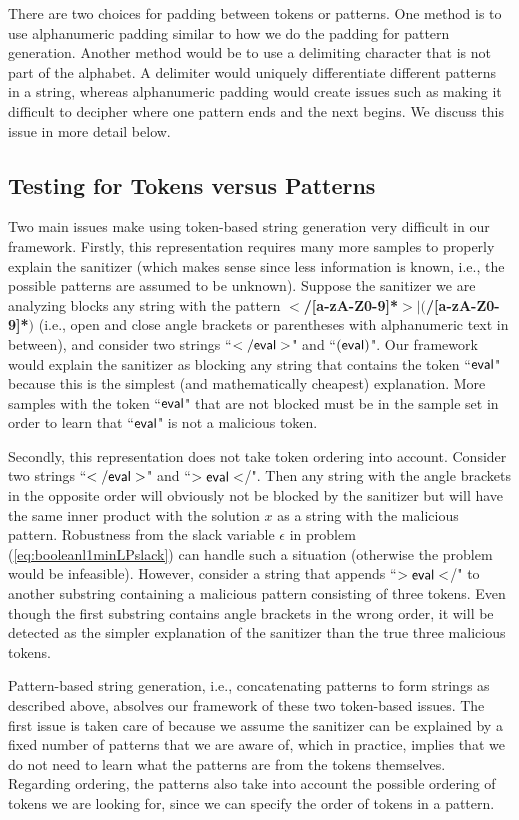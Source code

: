 There are two choices for padding between tokens or patterns. One method is to use alphanumeric padding similar to how we do the padding for pattern generation. Another method would be to use a delimiting character that is not part of the alphabet. A delimiter would uniquely differentiate different patterns in a string, whereas alphanumeric padding would create issues such as making it difficult to decipher where one pattern ends and the next begins. We discuss this issue in more detail below.

\subsection{Testing for Tokens versus Patterns}
Two main issues make using token-based string generation very difficult in our framework. Firstly, this representation requires many more samples to properly explain the sanitizer (which makes sense since less information is known, i.e., the possible patterns are assumed to be unknown). Suppose the sanitizer we are analyzing blocks any string with the pattern \textbf{$<$/[a-zA-Z0-9]*$>$$|$$($/[a-zA-Z0-9]*$)$} (i.e., open and close angle brackets or parentheses with alphanumeric text in between), and consider two strings ``$\sf{</eval>}$" and ``$\sf{(eval)}$". Our framework would explain the sanitizer as blocking any string that contains the token ``$\sf{eval}$" because this is the simplest (and mathematically cheapest) explanation. More samples with the token ``$\sf{eval}$" that are not blocked must be in the sample set in order to learn that ``$\sf{eval}$" is not a malicious token.

Secondly, this representation does not take token ordering into account. Consider two strings ``$\sf{</eval>}$" and ``$\sf{>eval<}$/". Then any string with the angle brackets in the opposite order will obviously not be blocked by the sanitizer but will have the same inner product with the solution $x$ as a string with the malicious pattern. Robustness from the slack variable $\epsilon$ in problem (\ref{eq:booleanl1minLPslack}) can handle such a situation (otherwise the problem would be infeasible). However, consider a string that appends ``$\sf{>eval<}$/" to another substring containing a malicious pattern consisting of three tokens.  Even though the  first substring contains angle brackets in the wrong order, it will be detected as the simpler explanation of the sanitizer than the true three malicious tokens.

Pattern-based string generation, i.e., concatenating patterns to form strings as described above, absolves our framework of these two token-based issues. The first issue is taken care of because we assume the sanitizer can be explained by a fixed number of patterns that we are aware of, which in practice, implies that we do not need to learn what the patterns are from the tokens themselves. Regarding ordering, the patterns also take into account the possible ordering of tokens we are looking for, since we can specify the order of tokens in a pattern.

